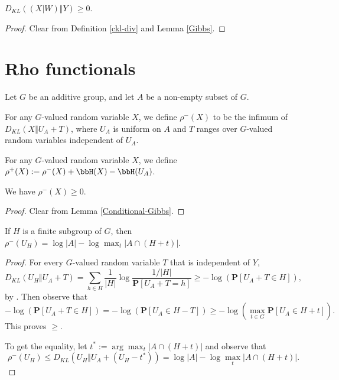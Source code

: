 \begin{lemma}\label{Conditional-Gibbs}\leanok  $D_{KL}((X|W)\Vert Y) \geq 0$.
\end{lemma}

\begin{proof}\leanok {}  Clear from Definition \ref{ckl-div} and Lemma \ref{Gibbs}.
\end{proof}

\section{Rho functionals}

Let $G$ be an additive group, and let $A$ be a non-empty subset of $G$.

\begin{definition}\label{rhominus-def}\leanok  For any $G$-valued random variable $X$, we define $\rho^-(X)$ to be the infimum of $D_{KL}(X \Vert  U_A + T)$, where $U_A$ is uniform on $A$ and $T$ ranges over $G$-valued random variables independent of $U_A$.
\end{definition}

\begin{definition}\label{rhoplus-def}\leanok  For any $G$-valued random variable $X$, we define $\rho^+(X) := \rho^-(X) + \bbH(X) - \bbH(U_A)$.
\end{definition}

\begin{lemma}\label{rhominus-nonneg}\label{rhoMinus_nonneg}\leanok  We have $\rho^-(X) \geq 0$.
\end{lemma}

\begin{proof}\leanok {} Clear from Lemma \ref{Conditional-Gibbs}.
\end{proof}

\begin{lemma}\label{rhominus-subgroup}\leanok If $H$ is a finite subgroup of $G$, then $\rho^-(U_H) = \log |A| - \log \max_t |A \cap (H+t)|$.
\end{lemma}

\begin{proof}\leanok
  For every $G$-valued random variable $T$ that is independent of $Y$,
  $$D_{KL}(U_H \Vert U_A+T) = \sum_{h\in H} \frac{1}{|H|}\log\frac{1/|H|}{\mathbf{P}[U_A+T=h]}\ge -\log(\mathbf{P}[U_A+T\in H]),$$
  by . Then observe that $$-\log(\mathbf{P}[U_A+T\in H])=-\log(\mathbf{P}[U_A\in H-T])\ge -\log(\max_{t\in G} \mathbf{P}[U_A\in H+t]).$$ This proves $\ge$.

  To get the equality, let $t^*:=\arg\max_t |A \cap (H+t)|$ and observe that $$\rho^-(U_H)\le D_{KL}(U_H \Vert  U_A+(U_H-t^*))= \log |A| - \log \max_t|A \cap (H+t)|.$$
\end{proof}

